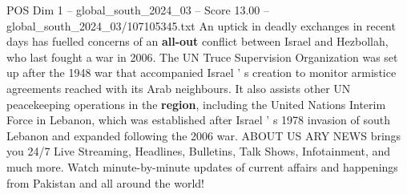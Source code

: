 \begin{textsample}{POS Dim 1 – global\_south\_2024\_03 – Score 13.00 – global\_south\_2024\_03/107105345.txt}
An uptick in deadly exchanges in recent days has fuelled concerns of an \textbf{all-out} conflict between Israel and Hezbollah, who last fought a war in 2006.
The UN Truce Supervision Organization was set up after the 1948 war that accompanied Israel ' s creation to monitor armistice agreements reached with its Arab neighbours.
It also assists other UN peacekeeping operations in the \textbf{region}, including the United Nations Interim Force in Lebanon, which was established after Israel ' s 1978 invasion of south Lebanon and expanded following the 2006 war.
ABOUT US ARY NEWS brings you 24/7 Live Streaming, Headlines, Bulletins, Talk Shows, Infotainment, and much more.
Watch minute-by-minute updates of current affairs and happenings from Pakistan and all around the world!

\end{textsample}
